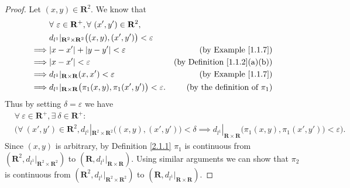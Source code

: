 \begin{proof}
    Let \((x, y) \in \mathbf{R}^2\).
    We know that
    \begin{align*}
                 & \forall\ \varepsilon \in \mathbf{R}^+, \forall\ (x', y') \in \mathbf{R}^2,                                                            \\
                 & d_{l^1}|_{\mathbf{R}^2 \times \mathbf{R}^2}\big((x, y), (x', y')\big) < \varepsilon                                                   \\
        \implies & \abs*{x - x'} + \abs*{y - y'} < \varepsilon                                                & \text{(by Example \ref{1.1.7})}          \\
        \implies & \abs*{x - x'} < \varepsilon                                                                & \text{(by Definition \ref{1.1.2}(a)(b))} \\
        \implies & d_{l^1}|_{\mathbf{R} \times \mathbf{R}}(x, x') < \varepsilon                               & \text{(by Example \ref{1.1.7})}          \\
        \implies & d_{l^1}|_{\mathbf{R} \times \mathbf{R}}\big(\pi_1(x, y), \pi_1(x', y')\big) < \varepsilon. & \text{(by the definition of \(\pi_1\))}
    \end{align*}
    Thus by setting \(\delta = \varepsilon\) we have
    \begin{align*}
         & \forall\ \varepsilon \in \mathbf{R}^+, \exists\ \delta \in \mathbf{R}^+ :                                                                                                                                                        \\
         & \Big(\forall\ (x', y') \in \mathbf{R}^2, d_{l^1}|_{\mathbf{R}^2 \times \mathbf{R}^2}\big((x, y), (x', y')\big) < \delta \implies d_{l^1}|_{\mathbf{R} \times \mathbf{R}}\big(\pi_1(x, y), \pi_1(x', y')\big) < \varepsilon\Big).
    \end{align*}
    Since \((x, y)\) is arbitrary, by Definition \ref{2.1.1} \(\pi_1\) is continuous from \((\mathbf{R}^2, d_{l^1}|_{\mathbf{R}^2 \times \mathbf{R}^2})\) to \((\mathbf{R}, d_{l^1}|_{\mathbf{R} \times \mathbf{R}})\).
    Using similar arguments we can show that \(\pi_2\) is continuous from \((\mathbf{R}^2, d_{l^1}|_{\mathbf{R}^2 \times \mathbf{R}^2})\) to \((\mathbf{R}, d_{l^1}|_{\mathbf{R} \times \mathbf{R}})\).


\end{proof}
